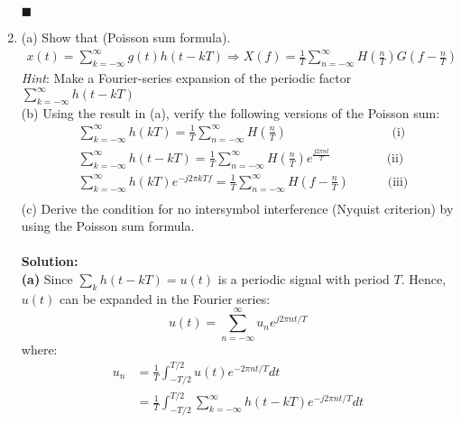 \documentclass[a4paper,12pt]{article}
\begin{document}
\begin{enumerate}
            \begin{flushright}
                $\blacksquare$
            \end{flushright}
        \item 
            (a) Show that (Poisson sum formula).
            \begin{align*}
                x(t) = \sum_{k = - \infty}^{\infty} g(t)h(t - kT) 
                \Rightarrow X(f) = \frac{1}{T} \sum_{n = - \infty}^{\infty} H(\frac{n}{T}) G(f - \frac{n}{T})
            \end{align*}
            \textit{Hint}: Make a Fourier-series expansion of the periodic factor 
            $\sum_{k = - \infty}^{\infty} h(t - kT)$ \\ 
            (b) Using the result in (a), verify the following versions of the Poisson sum: 
            \begin{align*}
                & \sum_{k = - \infty}^{\infty} h(kT) = \frac{1}{T} \sum_{n = - \infty}^{\infty} H(\frac{n}{T}) \;\;\;\;\;\;\;\;\;\;\;\;\;\;\;\;\;\;\;\;\;\;\;\;\;\;\;\;\;\; \text{(i)} \\ 
                & \sum_{k = - \infty}^{\infty} h(t - kT) = \frac{1}{T} \sum_{n = - \infty}^{\infty} H(\frac{n}{T})e^{\frac{j2\pi nt}{T}} \;\;\;\;\;\;\;\;\;\;\;\;\;\;\;\; \text{(ii)} \\ 
                & \sum_{k = - \infty}^{\infty} h(kT) e^{-j2 \pi kTf} = \frac{1}{T} \sum_{n = - \infty}^{\infty}H(f - \frac{n}{T}) \;\;\;\;\;\;\;\;\;\;\; \text{(iii)} \\ 
            \end{align*}
            (c) Derive the condition for no intersymbol interference (Nyquist criterion) by using the Poisson sum formula. \\ \\
            \textbf{Solution:} \\
            \textbf{(a)} 
            Since $\sum_{k} h(t - kT) = u(t)$ is a periodic signal with period $T$. Hence, $u(t)$ can be expanded in the Fourier series: $$u(t) = \sum_{n = -\infty}^{\infty} u_{n}e^{j2 \pi nt/T}$$ where:
            \begin{align*}
                u_n &= \frac{1}{T} \int_{-T/2}^{T/2} u(t)e^{-2\pi nt/T}dt \\
                    &= \frac{1}{T} \int_{-T/2}^{T/2} \sum_{k = -\infty}^{\infty} h(t - kT) e^{-j2 \pi nt/T}dt \\

\end{align*}
\end{enumerate}
\end{document}
